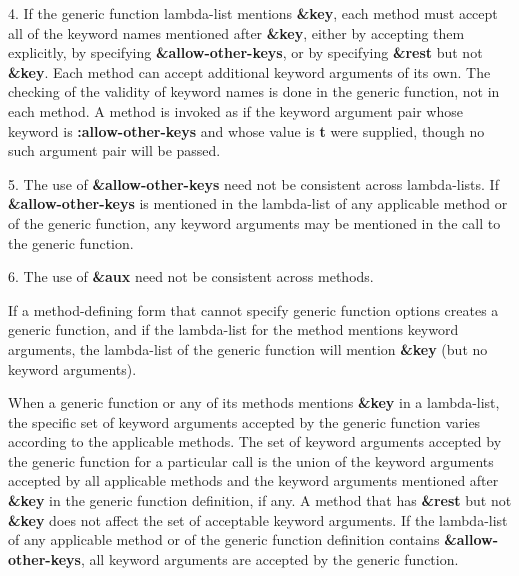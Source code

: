\item{4.} If the generic function lambda-list mentions {\bf \&key}, each
method must accept all of the keyword names mentioned after {\bf \&key},
either by accepting them explicitly, by specifying {\bf
\&allow-other-keys}, or by specifying {\bf \&rest} but not {\bf \&key}.
Each method can accept additional keyword arguments of its own.  The
checking of the validity of keyword names is done in the generic
function, not in each method. A method is invoked as if the keyword
argument pair whose  keyword is {\bf :allow-other-keys} and whose value
is {\bf t} were supplied, though no such argument pair will be passed.

\item{5.} The use of {\bf \&allow-other-keys} need not be consistent
across lambda-lists.  If {\bf \&allow-other-keys} is mentioned in 
the lambda-list of any applicable method or of the generic function,
any keyword arguments may be mentioned in the call to the
generic function.

\item{6.} The use of {\bf \&aux} need not be consistent across methods.

If a method-defining form that cannot specify generic function options
creates a generic function, and if the lambda-list for the method
mentions keyword arguments, the lambda-list of the generic function
will mention {\bf \&key} (but no keyword arguments).

\endlist


\endsubSection%



When a generic function or any of its methods mentions {\bf \&key} in
a lambda-list, the specific set of keyword arguments accepted by the
generic function varies according to the applicable methods.  The set
of keyword arguments accepted by the generic function for a particular
call is the union of the keyword arguments accepted by all applicable
methods and the keyword arguments mentioned after {\bf \&key} in the
generic function definition, if any.  A method that has {\bf \&rest}
but not {\bf \&key} does not affect the set of acceptable keyword
arguments.  If the lambda-list of any applicable method or of the
generic function definition contains {\bf \&allow-other-keys}, all
keyword arguments are accepted by the generic function.

